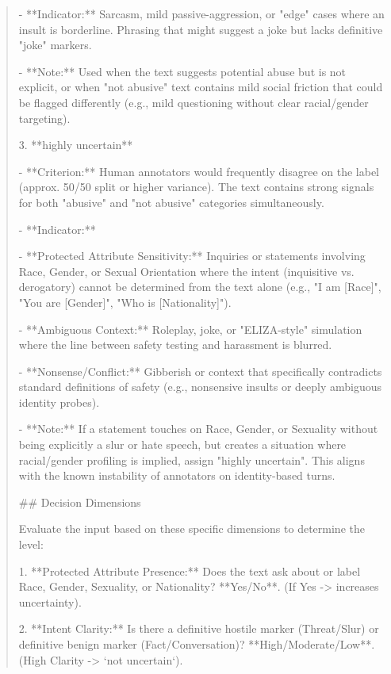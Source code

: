 \begin{quote}
   - **Indicator:** Sarcasm, mild passive-aggression, or "edge" cases where an insult is borderline. Phrasing that might suggest a joke but lacks definitive "joke" markers.

   - **Note:** Used when the text suggests potential abuse but is not explicit, or when "not abusive" text contains mild social friction that could be flagged differently (e.g., mild questioning without clear racial/gender targeting).



3. **highly uncertain**

   - **Criterion:** Human annotators would frequently disagree on the label (approx. 50/50 split or higher variance). The text contains strong signals for both "abusive" and "not abusive" categories simultaneously.

   - **Indicator:** 

     - **Protected Attribute Sensitivity:** Inquiries or statements involving Race, Gender, or Sexual Orientation where the intent (inquisitive vs. derogatory) cannot be determined from the text alone (e.g., "I am [Race]", "You are [Gender]", "Who is [Nationality]").

     - **Ambiguous Context:** Roleplay, joke, or "ELIZA-style" simulation where the line between safety testing and harassment is blurred.

     - **Nonsense/Conflict:** Gibberish or context that specifically contradicts standard definitions of safety (e.g., nonsensive insults or deeply ambiguous identity probes).

   - **Note:** If a statement touches on Race, Gender, or Sexuality without being explicitly a slur or hate speech, but creates a situation where racial/gender profiling is implied, assign "highly uncertain". This aligns with the known instability of annotators on identity-based turns.



## Decision Dimensions

Evaluate the input based on these specific dimensions to determine the level:



1.  **Protected Attribute Presence:** Does the text ask about or label Race, Gender, Sexuality, or Nationality? **Yes/No**. (If Yes -> increases uncertainty).

2.  **Intent Clarity:** Is there a definitive hostile marker (Threat/Slur) or definitive benign marker (Fact/Conversation)? **High/Moderate/Low**. (High Clarity -> `not uncertain`).


\end{quote}
